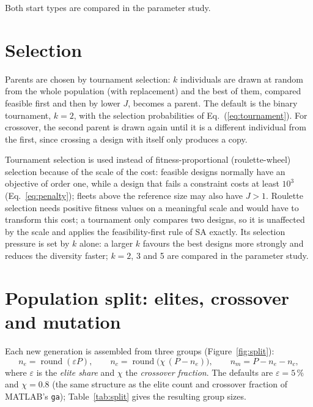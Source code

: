Both start types are compared in the parameter study.

\section{Selection}
\label{sec:ga-selection}

Parents are chosen by tournament selection: $k$ individuals are drawn at random from the whole
population (with replacement) and the best of them, compared feasible first and then by lower $J$,
becomes a parent. The default is the binary tournament, $k=2$, with the selection probabilities of
Eq.~(\ref{eq:tournament}). For crossover, the second parent is drawn again until it is a different
individual from the first, since crossing a design with itself only produces a copy.

Tournament selection is used instead of fitness-proportional (roulette-wheel) selection because of
the scale of the cost: feasible designs normally have an objective of order one, while a design that
fails a constraint costs at least $10^3$ (Eq.~\ref{eq:penalty}); fleets above the reference size may
also have $J>1$. Roulette selection needs positive fitness values on a
meaningful scale and would have to transform this cost; a tournament only compares two designs,
so it is unaffected by the scale and applies the feasibility-first rule of \ac{SA} exactly. Its
selection pressure is set by $k$ alone: a larger $k$ favours the best designs more strongly and
reduces the diversity faster; $k=2$, 3 and 5 are compared in the parameter study.

\section{Population split: elites, crossover and mutation}
\label{sec:ga-split}

Each new generation is assembled from three groups (Figure~\ref{fig:split}):
\begin{equation}
n_e=\operatorname{round}(\varepsilon P),\qquad
n_c=\operatorname{round}\bigl(\chi\,(P-n_e)\bigr),\qquad
n_m=P-n_e-n_c,
\label{eq:split}
\end{equation}
where $\varepsilon$ is the \emph{elite share} and $\chi$ the \emph{crossover fraction}. The defaults
are $\varepsilon=5\,\%$ and $\chi=0.8$ (the same structure as the elite count and crossover
fraction of MATLAB's \texttt{ga}); Table~\ref{tab:split} gives the resulting group sizes.

